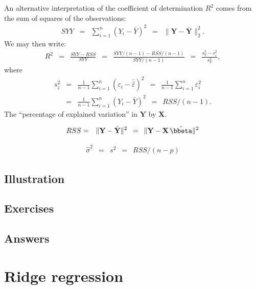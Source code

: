 \documentclass[a4paper]{article}
\theoremstyle{myexamplestyle}
\begin{document}
An alternative interpretation of the coefficient of determination $R^2$ comes from the sum of squares of the observations:
\begin{eqnarray*}
SYY & = & \sum_{i=1}^n (Y_i - \bar{Y})^2  \, \, \, = \, \, \, \| \mathbf{Y} - \bar{\mathbf{Y}} \|^2_2.
\end{eqnarray*}
We may then write:
\begin{eqnarray*}
R^2 & = & \frac{ SYY - RSS }{ SYY } \, \, \, = \, \, \, \frac{ SYY/(n-1) - RSS/(n-1) }{ SYY/(n-1) } \, \, \, = \, \, \,  \frac{ s_Y^2 - s^2_{\hat{\varepsilon}} }{ s_Y^2 },
\end{eqnarray*}
where
\begin{eqnarray*}
s^2_{\hat{\varepsilon}} & = & \frac{1}{n-1} \sum_{i=1}^n (\varepsilon_i - \bar{\hat{\varepsilon}})^2
\, \, \, = \, \, \, \frac{1}{n-1} \sum_{i=1}^n \varepsilon_i^2
\\
& = & \frac{1}{n-1} \sum_{i=1}^n (Y_i - \bar{Y})^2 \, \, \, = \, \, \, RSS / (n-1).
\end{eqnarray*}
The ``percentage of explained variation'' in $\mathbf{Y}$ by $\mathbf{X}$.


\begin{eqnarray*}
RSS & = &  \| \mathbf{Y} - \hat{\mathbf{Y}} \|^2 \, \, \, = \, \, \,  \| \mathbf{Y} - \mathbf{X} \, \hat{\bbeta} \|^2
\end{eqnarray*}


\begin{eqnarray*}
\hat{\sigma}^2 & = &  s^2 \, \, \, = \, \, \, RSS / (n-p)
\end{eqnarray*}




\subsection{Illustration}

\subsection{Exercises}

\subsection{Answers}






\newpage
\section{Ridge regression}
\end{document}
